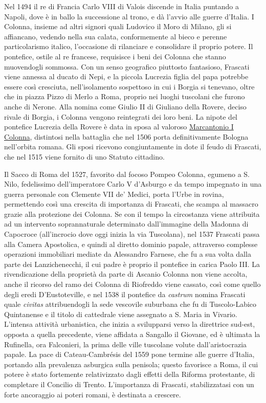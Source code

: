 \documentclass[
  letterpaper,
  DIV=11,
  numbers=noendperiod]{scrartcl}
\begin{document}
Nel 1494 il re di Francia Carlo VIII di Valois discende in Italia
puntando a Napoli, dove è in ballo la successione al trono, e dà l'avvio
alle guerre d'Italia. I Colonna, insieme ad altri signori quali Ludovico
il Moro di Milano, gli si affiancano, vedendo nella sua calata,
conformemente al bieco e perenne particolarismo italico, l'occasione di
rilanciare e consolidare il proprio potere. Il pontefice, ostile al re
francese, requisisce i beni dei Colonna che stanno muovendogli sommossa.
Con un senso geografico piuttosto fantasioso, Frascati viene annessa al
ducato di Nepi, e la piccola Lucrezia figlia del papa potrebbe essere
così cresciuta, nell'isolamento sospettoso in cui i Borgia si tenevano,
oltre che in piazza Pizzo di Merlo a Roma, proprio nei luoghi tuscolani
che furono anche di Nerone. Alla nomina come Giulio II di Giuliano della
Rovere, deciso rivale di Borgia, i Colonna vengono reintegrati dei loro
beni. La nipote del pontefice Lucrezia della Rovere è data in sposa al
valoroso \protect\hyperlink{0}{Marcantonio I Colonna}, distintosi nella
battaglia che nel 1506 porta definitivamente Bologna nell'orbita romana.
Gli sposi ricevono congiuntamente in dote il feudo di Frascati, che nel
1515 viene fornito di uno Statuto cittadino.

Il Sacco di Roma del 1527, favorito dal focoso Pompeo Colonna, egumeno a
S. Nilo, fedelissimo dell'imperatore Carlo V d'Asburgo e da tempo
impegnato in una guerra personale con Clemente VII de' Medici, porta
l'Urbe in rovina, permettendo così una crescita di importanza di
Frascati, che scampa al massacro grazie alla protezione dei Colonna. Se
con il tempo la circostanza viene attribuita ad un intervento
soprannaturale determinato dall'immagine della Madonna di Capocroce
(all'incrocio dove oggi inizia la via Tuscolana), nel 1537 Frascati
passa alla Camera Apostolica, e quindi al diretto dominio papale,
attraverso complesse operazioni immobiliari mediate da Alessandro
Farnese, che fu a sua volta dalla parte dei Lanzichenecchi, il cui padre
è proprio il pontefice in carica Paolo III. La rivendicazione della
proprietà da parte di Ascanio Colonna non viene accolta, anche il
ricorso del ramo dei Colonna di Riofreddo viene cassato, così come
quello degli eredi D'Eustoteville, e nel 1538 il pontefice da
\emph{castrum} nomina Frascati quale \emph{civitas} attribuendogli la
sede vescovile suburbana che fu di Tuscolo-Labico Quintanense e il
titolo di cattedrale viene assegnato a S. Maria in Vivario. L'intensa
attività urbanistica, che inizia a svilupparsi verso la direttrice
sud-est, opposta a quella precedente, viene affidata a Sangallo il
Giovane, ed è ultimata la Rufinella, ora Falconieri, la prima delle
ville tuscolane volute dall'aristocrazia papale. La pace di
Cateau-Cambrésis del 1559 pone termine alle guerre d'Italia, portando
alla prevalenza asburgica sulla penisola; questo favorisce a Roma, il
cui potere è stato fortemente relativizzato dagli effetti della Riforma
protestante, di completare il Concilio di Trento. L'importanza di
Frascati, stabilizzatasi con un forte ancoraggio ai poteri romani, è
destinata a crescere.
\end{document}
